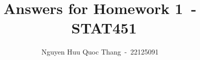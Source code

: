 \documentclass[12pt,a4paper]{article}
\begin{document}
\title{Answers for Homework 1~-~STAT451}
\author{Nguyen Huu Quoc Thang~-~22125091}

\maketitle


\end{document}

